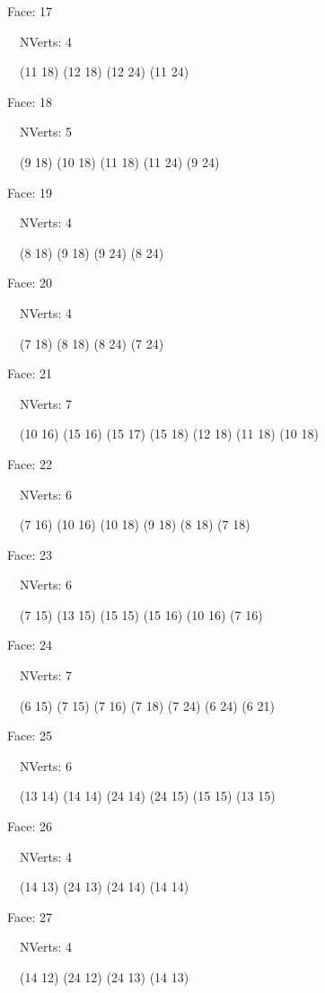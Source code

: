 \documentclass{article}
\begin{document}
{\footnotesize 

Face: 17

\   \    NVerts: 4

 \   \   (11 18) (12 18) (12 24) (11 24)}

{\footnotesize 

Face: 18

\   \    NVerts: 5

 \   \   (9 18) (10 18) (11 18) (11 24) (9 24)}

{\footnotesize 

Face: 19

\   \    NVerts: 4

 \   \   (8 18) (9 18) (9 24) (8 24)}

{\footnotesize 

Face: 20

\   \    NVerts: 4

 \   \   (7 18) (8 18) (8 24) (7 24)}

{\footnotesize 

Face: 21

\   \    NVerts: 7

 \   \   (10 16) (15 16) (15 17) (15 18) (12 18) (11 18) (10 18)}

{\footnotesize 

Face: 22

\   \    NVerts: 6

 \   \   (7 16) (10 16) (10 18) (9 18) (8 18) (7 18)}

{\footnotesize 

Face: 23

\   \    NVerts: 6

 \   \   (7 15) (13 15) (15 15) (15 16) (10 16) (7 16)}

{\footnotesize 

Face: 24

\   \    NVerts: 7

 \   \   (6 15) (7 15) (7 16) (7 18) (7 24) (6 24) (6 21)}

{\footnotesize 

Face: 25

\   \    NVerts: 6

 \   \   (13 14) (14 14) (24 14) (24 15) (15 15) (13 15)}

{\footnotesize 

Face: 26

\   \    NVerts: 4

 \   \   (14 13) (24 13) (24 14) (14 14)}

{\footnotesize 

Face: 27

\   \    NVerts: 4

 \   \   (14 12) (24 12) (24 13) (14 13)}
\end{document}
